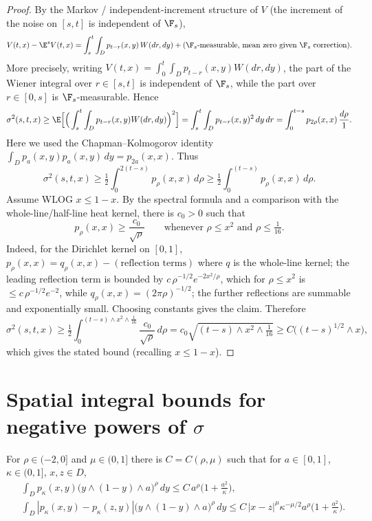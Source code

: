 \begin{proof}
By the Markov / independent-increment structure of $V$ (the increment of the noise on $[s,t]$ is independent of $\F_s$),
\[
V(t,x)-\E^s V(t,x)=\int_s^t\int_D p_{t-r}(x,y)\,W(dr,dy)+\text{($\F_s$-measurable, mean zero given $\F_s$ correction)}.
\]
More precisely, writing $V(t,x)=\int_0^t\int_D p_{t-r}(x,y)W(dr,dy)$, the part of the Wiener integral over $r\in[s,t]$ is independent of $\F_s$, while the part over $r\in[0,s]$ is $\F_s$-measurable. Hence
\[
\sigma^2(s,t,x)\ge \E\Big[\Big(\int_s^t\int_D p_{t-r}(x,y)W(dr,dy)\Big)^2\Big]=\int_s^t\int_D p_{t-r}(x,y)^2\,dy\,dr=\int_0^{t-s}p_{2\rho}(x,x)\,\frac{d\rho}{1}.
\]
Here we used the Chapman--Kolmogorov identity $\int_D p_a(x,y)p_a(x,y)\,dy=p_{2a}(x,x)$. Thus
\[
\sigma^2(s,t,x)\ge \tfrac12\int_0^{2(t-s)}p_{\rho}(x,x)\,d\rho\ge \tfrac12\int_0^{(t-s)}p_\rho(x,x)\,d\rho.
\]
Assume WLOG $x\le 1-x$. By the spectral formula and a comparison with the whole-line/half-line heat kernel, there is $c_0>0$ such that
\[
p_\rho(x,x)\ge \frac{c_0}{\sqrt\rho}\qquad\text{whenever } \rho\le x^2 \text{ and } \rho\le \tfrac1{16}.
\]
Indeed, for the Dirichlet kernel on $[0,1]$, $p_\rho(x,x)=q_\rho(x,x)-(\text{reflection terms})$ where $q$ is the whole-line kernel; the leading reflection term is bounded by $c\,\rho^{-1/2}e^{-2x^2/\rho}$, which for $\rho\le x^2$ is $\le c\,\rho^{-1/2}e^{-2}$, while $q_\rho(x,x)=(2\pi\rho)^{-1/2}$; the further reflections are summable and exponentially small. Choosing constants gives the claim. Therefore
\[
\sigma^2(s,t,x)\ge \tfrac12\int_0^{(t-s)\wedge x^2\wedge\frac1{16}}\frac{c_0}{\sqrt\rho}\,d\rho
= c_0\sqrt{(t-s)\wedge x^2\wedge\tfrac1{16}}\ge C\big((t-s)^{1/2}\wedge x\big),
\]
which gives the stated bound (recalling $x\le 1-x$).
\end{proof}

\section{Spatial integral bounds for negative powers of $\sigma$}

\begin{lemma}\label{L:skb}
For $\rho\in(-2,0]$ and $\mu\in(0,1]$ there is $C=C(\rho,\mu)$ such that for $a\in[0,1]$, $\kappa\in(0,1]$, $x,z\in D$,
\begin{align*}
&\int_D p_\kappa(x,y)\big(y\wedge(1-y)\wedge a\big)^\rho\,dy\le C\,a^\rho\Big(1+\frac{a^2}{\kappa}\Big),\\
&\int_D|p_\kappa(x,y)-p_\kappa(z,y)|\big(y\wedge(1-y)\wedge a\big)^\rho\,dy\le C\,|x-z|^\mu\kappa^{-\mu/2}a^\rho\Big(1+\frac{a^2}{\kappa}\Big).
\end{align*}
\end{lemma}

